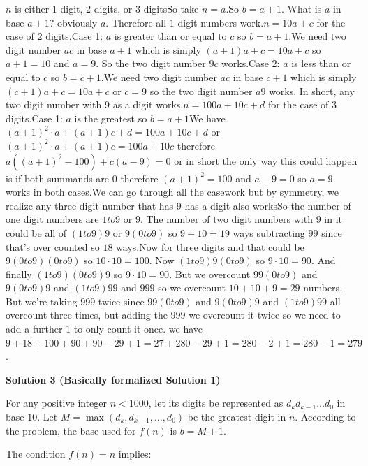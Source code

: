 \begin{enumerate}
$n$ is either $1$ digit, $2$ digits, or $3$ digitsSo take $n = a$.So $b = a + 1$. What is $a$ in base $a + 1$? obviously $a$. Therefore all $1$ digit numbers work.$n = 10a + c$ for the case of $2$ digits.Case 1: $a$ is greater than or equal to $c$ so $b = a + 1$.We need two digit number $ac$ in base $a+1$ which is simply $(a + 1)a + c = 10a + c$ so $a + 1 = 10$ and $a = 9$. So the two digit number $9c$ works.Case 2: $a$ is less than or equal to $c$ so $b = c + 1$.We need two digit number $ac$ in base $c + 1$ which is simply $(c + 1)a + c = 10a + c$ or $c = 9$ so the two digit number $a9$ works. In short, any two digit number with $9$ as a digit works.$n = 100a + 10c + d$ for the case of $3$ digits.Case 1: $a$ is the greatest so $b = a + 1$We have $(a + 1)^2 \cdot a + (a + 1)c + d = 100a + 10c + d$ or $(a + 1)^2 \cdot a + (a + 1)c = 100a + 10c$ therefore $a((a + 1)^2 - 100) + c(a - 9) = 0$ or in short the only way this could happen is if both summands are $0$ therefore $(a + 1)^2 = 100$ and $a - 9 = 0$ so $a = 9$ works in both cases.We can go through all the casework but by symmetry, we realize any three digit number that has $9$ has a digit also worksSo the number of one digit numbers are $1 to 9$ or $9$. The number of two digit numbers with $9$ in it could be all of $(1 to 9)9$ or $9(0 to 9)$ so $9 + 10 = 19$ ways subtracting $99$ since that's over counted so $18$ ways.Now for three digits and that could be $9(0 to 9)(0 to 9)$ so $10 \cdot 10 = 100$. Now $(1 to 9)9(0 to 9)$ so $9 \cdot 10 = 90$. And finally $(1 to 9)(0 to 9)9$ so $9 \cdot 10 = 90$. But we overcount $99(0 to 9)$ and $9(0 to 9)9$ and $(1 to 9)99$ and $999$ so we overcount $10 + 10 + 9 = 29$ numbers. But we're taking $999$ twice since $99(0 to 9)$ and $9(0 to 9)9$ and $(1 to 9)99$ all overcount three times, but adding the $999$ we overcount it twice so we need to add a further $1$ to only count it once. we have$9 + 18 + 100 + 90 + 90 - 29 + 1 = 27 + 280 - 29 + 1 = 280 - 2 + 1 = 280 - 1 = \boxed{279}$.

 


 



\textbf{Solution 3 (Basically formalized Solution 1)}

For any positive integer $n < 1000$, let its digits be represented as $d_k d_{k-1} \dots d_0$ in base $10$. Let $M = \max(d_k, d_{k-1}, \dots, d_0)$ be the greatest digit in $n$. According to the problem, the base used for $f(n)$ is $b = M + 1$.

 The condition $f(n) = n$ implies:


\end{enumerate}
